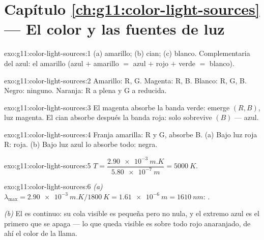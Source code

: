\section*{Capítulo \ref{ch:g11:color-light-sources} --- El color y las fuentes de luz}

\begin{solution}{exo:g11:color-light-sources:1}
(a) amarillo; (b) cian; (c) blanco. Complementaria del azul: el amarillo
(azul $+$ amarillo $=$ azul $+$ rojo $+$ verde $=$ blanco).
\end{solution}

\begin{solution}{exo:g11:color-light-sources:2}
Amarillo: R, G. Magenta: R, B. Blanco: R, G, B. Negro: ninguno. Naranja:
R a plena  y G a  reducida.
\end{solution}

\begin{solution}{exo:g11:color-light-sources:3}
El magenta absorbe la banda verde: emerge $(R, B)$, luz magenta. El
 cian absorbe después la banda roja: solo sobrevive $(B)$ ---
azul.
\end{solution}

\begin{solution}{exo:g11:color-light-sources:4}
Franja amarilla:  R y G, absorbe B. (a) Bajo luz roja  R:
roja. (b) Bajo luz azul lo absorbe todo: negra.
\end{solution}

\begin{solution}{exo:g11:color-light-sources:5}
$T = \dfrac{\qty{2.90e-3}{m.K}}{\qty{5.80e-7}{m}} = \qty{5000}{K}$.
\end{solution}

\begin{solution}{exo:g11:color-light-sources:6}
\emph{(a)} $\lambda_{\max} = \qty{2.90e-3}{m.K}/\qty{1800}{K}
= \qty{1.61e-6}{m} = \qty{1610}{nm}$: .

\emph{(b)} El  es continuo: su cola visible es pequeña pero no
nula, y el extremo azul es el primero que se apaga --- lo que queda
visible es sobre todo rojo anaranjado, de ahí el color de la llama.
\end{solution}

